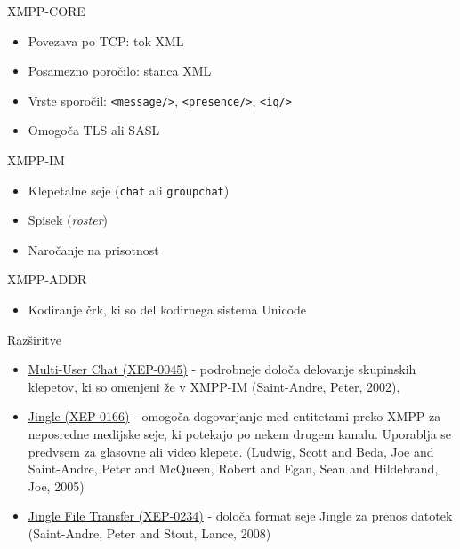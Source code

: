 \documentclass[presentation]{beamer}
\begin{document}
\begin{frame}[label={sec:org29df804},fragile]{XMPP-CORE}
 \begin{itemize}
\item Povezava po TCP: tok XML
\item Posamezno poročilo: stanca XML
\item Vrste sporočil: \texttt{<message/>}, \texttt{<presence/>}, \texttt{<iq/>}
\item Omogoča TLS ali SASL
\end{itemize}
\end{frame}

\begin{frame}[label={sec:orgc123230},fragile]{XMPP-IM}
 \begin{itemize}
\item Klepetalne seje (\texttt{chat} ali \texttt{groupchat})
\item Spisek (\emph{roster})
\item Naročanje na prisotnost
\end{itemize}
\end{frame}

\begin{frame}[label={sec:org0123109}]{XMPP-ADDR}
\begin{itemize}
\item Kodiranje črk, ki so del kodirnega sistema Unicode
\end{itemize}
\end{frame}

\begin{frame}[label={sec:orgd619065}]{Razširitve}
\begin{itemize}
\item \href{https://xmpp.org/extensions/xep-0045.html}{Multi-User Chat (XEP-0045)} - podrobneje določa delovanje skupinskih
klepetov, ki so omenjeni že v XMPP-IM (Saint-Andre, Peter, 2002),
\item \href{https://xmpp.org/extensions/xep-0166.html}{Jingle (XEP-0166)} - omogoča dogovarjanje med entitetami preko XMPP
za neposredne medijske seje, ki potekajo po nekem drugem
kanalu. Uporablja se predvsem za glasovne ali video
klepete. (Ludwig, Scott and Beda, Joe and Saint-Andre, Peter and McQueen, Robert and Egan, Sean and Hildebrand, Joe, 2005)
\item \href{https://xmpp.org/extensions/xep-0234.html}{Jingle File Transfer (XEP-0234)} - določa format seje Jingle za
prenos datotek (Saint-Andre, Peter and Stout, Lance, 2008)
\end{itemize}
\end{frame}
\end{document}

